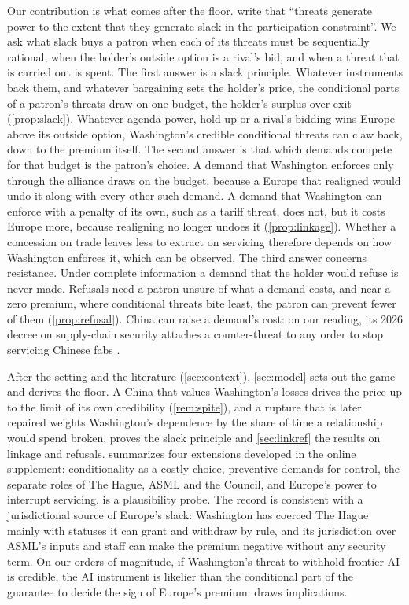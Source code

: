 Our contribution is what comes after the floor. \citet{clayton2026putting} write that ``threats generate power to the extent that they generate slack in the participation constraint''. We ask what slack buys a patron when each of its threats must be sequentially rational, when the holder's outside option is a rival's bid, and when a threat that is carried out is spent. The first answer is a slack principle. Whatever instruments back them, and whatever bargaining sets the holder's price, the conditional parts of a patron's threats draw on one budget, the holder's surplus over exit (\cref{prop:slack}). Whatever agenda power, hold-up or a rival's bidding wins Europe above its outside option, Washington's credible conditional threats can claw back, down to the premium itself. The second answer is that which demands compete for that budget is the patron's choice. A demand that Washington enforces only through the alliance draws on the budget, because a Europe that realigned would undo it along with every other such demand. A demand that Washington can enforce with a penalty of its own, such as a tariff threat, does not, but it costs Europe more, because realigning no longer undoes it (\cref{prop:linkage}). Whether a concession on trade leaves less to extract on servicing therefore depends on how Washington enforces it, which can be observed. The third answer concerns resistance. Under complete information a demand that the holder would refuse is never made. Refusals need a patron unsure of what a demand costs, and near a zero premium, where conditional threats bite least, the patron can prevent fewer of them (\cref{prop:refusal}). China can raise a demand's cost: on our reading, its 2026 decree on supply-chain security attaches a counter-threat to any order to stop servicing Chinese fabs \citep{statecouncil2026supplychain}.

After the setting and the literature (\cref{sec:context}), \cref{sec:model} sets out the game and derives the floor. A China that values Washington's losses drives the price up to the limit of its own credibility (\cref{rem:spite}), and a rupture that is later repaired weights Washington's dependence by the share of time a relationship would spend broken.  proves the slack principle and \cref{sec:linkref} the results on linkage and refusals.  summarizes four extensions developed in the online supplement: conditionality as a costly choice, preventive demands for control, the separate roles of The Hague, ASML and the Council, and Europe's power to interrupt servicing.  is a plausibility probe. The record is consistent with a jurisdictional source of Europe's slack: Washington has coerced The Hague mainly with statuses it can grant and withdraw by rule, and its jurisdiction over ASML's inputs and staff can make the premium negative without any security term. On our orders of magnitude, if Washington's threat to withhold frontier AI is credible, the AI instrument is likelier than the conditional part of the guarantee to decide the sign of Europe's premium.  draws implications.

